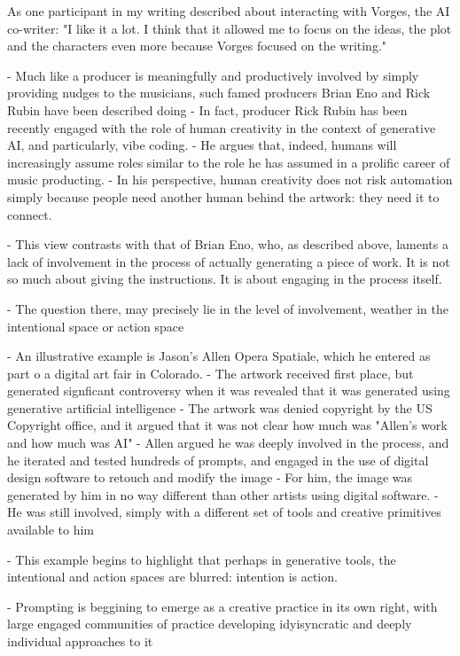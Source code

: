 As one participant in my writing described about interacting with Vorges, the AI co-writer: "I like it a lot. I think that it allowed me to focus on the ideas, the plot and the characters even more because Vorges focused on the writing."

- Much like a producer is meaningfully and productively involved by simply providing nudges to the musicians, such famed producers Brian Eno and Rick Rubin have been described doing
- In fact, producer Rick Rubin has been recently engaged with the role of human creativity in the context of generative AI, and particularly, vibe coding. 
- He argues that, indeed, humans will increasingly assume roles similar to the role he has assumed in a prolific career of music producting. 
- In his perspective, human creativity does not risk automation simply because people need another human behind the artwork: they need it to connect. 

- This view contrasts with that of Brian Eno, who, as described above, laments a lack of involvement in the process of actually generating a piece of work. It is not so much about giving the instructions. It is about engaging in the process itself. 

- The question there, may precisely lie in the level of involvement, weather in the intentional space or action space

- An illustrative example is Jason's Allen Opera Spatiale, which he entered as part o a digital art fair in Colorado. 
- The artwork received first place, but generated signficant controversy when it was revealed that it was generated using generative artificial intelligence 
- The artwork was denied copyright by the US Copyright office, and it argued that it was not clear how much was "Allen's work and how much was AI"
- Allen argued he was deeply involved in the process, and he iterated and tested hundreds of prompts, and engaged in the use of digital design software to retouch and modify the image
- For him, the image was generated by him in no way different than other artists using digital software. 
- He was still involved, simply with a different set of tools and creative primitives available to him

- This example begins to highlight that perhaps in generative tools, the intentional and action spaces are blurred: intention is action. 

- Prompting is beggining to emerge as a creative practice in its own right, with large engaged communities of practice developing idyisyncratic and deeply individual approaches to it \cite{Chang2023-tv}

